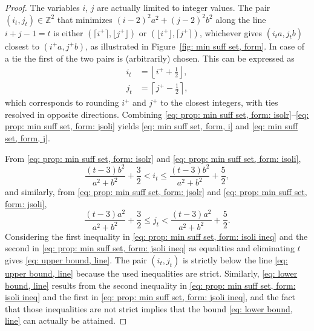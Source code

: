 \documentclass[12pt, a4paper]{article}
\newcommand{\tiles}{t} %
\newcommand{\isolr}{i^+}
\newcommand{\jsolr}{j^+}
\begin{document}
\begin{proof}
The variables $i$, $j$ are actually limited to integer values. The pair $(i_\tiles, j_\tiles) \in \mathbb Z^2$ that minimizes $(i-2)^2 a^2 + (j-2)^2 b^2$ along the line $i+j-1=\tiles$ is either $(\lceil \isolr \rceil, \lfloor \jsolr \rfloor)$ or $(\lfloor \isolr \rfloor, \lceil \jsolr \rceil)$, whichever gives $(i_\tiles a, j_\tiles b)$ closest to $(\isolr a, \jsolr b)$, as illustrated in Figure~\ref{fig: min suff set, form}. In case of a tie the first of the two pairs is (arbitrarily) chosen. This can be expressed as
\begin{align}
\label{eq: prop: min suff set, form: isoli}
i_\tiles &= \left\lfloor \isolr + \frac 1 2 \right\rfloor, \\
\label{eq: prop: min suff set, form: jsoli}
j_\tiles &= \left\lceil \jsolr - \frac 1 2 \right\rceil,
\end{align}
which corresponds to rounding $\isolr$ and $\jsolr$ to the closest integers, with ties resolved in opposite directions. Combining \eqref{eq: prop: min suff set, form: isolr}--\eqref{eq: prop: min suff set, form: jsoli}
yields \eqref{eq: min suff set, form, i} and \eqref{eq: min suff set, form, j}.

From \eqref{eq: prop: min suff set, form: isolr} and \eqref{eq: prop: min suff set, form: isoli},
\begin{equation}
\label{eq: prop: min suff set, form: isoli ineq}
\frac{(\tiles-3)b^2}{a^2+b^2} + \frac 3 2 < i_\tiles \leq \frac{(\tiles-3)b^2}{a^2+b^2} + \frac 5 2,
\end{equation}
and similarly, from \eqref{eq: prop: min suff set, form: jsolr} and \eqref{eq: prop: min suff set, form: jsoli},
\begin{equation}
\label{eq: prop: min suff set, form: jsoli ineq}
\frac{(\tiles-3)a^2}{a^2+b^2} + \frac 3 2 \leq j_\tiles < \frac{(\tiles-3)a^2}{a^2+b^2} + \frac 5 2.
\end{equation}
Considering the first inequality in \eqref{eq: prop: min suff set, form: isoli ineq} and the second in \eqref{eq: prop: min suff set, form: jsoli ineq} as equalities and eliminating $\tiles$ gives \eqref{eq: upper bound, line}. The pair $(i_\tiles, j_\tiles)$ is strictly below the line \eqref{eq: upper bound, line} because the used inequalities are strict. Similarly, \eqref{eq: lower bound, line} results from the second inequality in \eqref{eq: prop: min suff set, form: isoli ineq} and the first in \eqref{eq: prop: min suff set, form: jsoli ineq}, and the fact that those inequalities are not strict implies that the bound \eqref{eq: lower bound, line} can actually be attained.
\end{proof}
\end{document}
